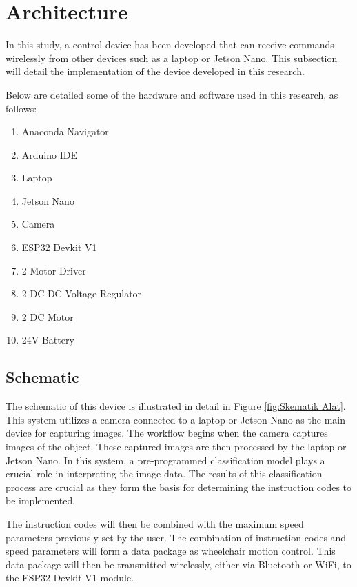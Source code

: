 \section{Architecture}
\label{sec:arsitektur}

In this study, a control device has been developed that can receive commands wirelessly from other devices such as a laptop or Jetson Nano. This subsection will detail the implementation of the device developed in this research.

Below are detailed some of the hardware and software used in this research, as follows:
\begin{enumerate}
    \item Anaconda Navigator
    \item Arduino IDE 
    \item Laptop 
    \item Jetson Nano
    \item Camera
    \item ESP32 Devkit V1
    \item 2 Motor Driver
    \item 2 DC-DC Voltage Regulator
    \item 2 DC Motor
    \item 24V Battery
\end{enumerate}

\subsection{Schematic}
\label{subsec:skematik alat}

The schematic of this device is illustrated in detail in Figure \ref{fig:Skematik Alat}. This system utilizes a camera connected to a laptop or Jetson Nano as the main device for capturing images. The workflow begins when the camera captures images of the object. These captured images are then processed by the laptop or Jetson Nano. In this system, a pre-programmed classification model plays a crucial role in interpreting the image data. The results of this classification process are crucial as they form the basis for determining the instruction codes to be implemented.

The instruction codes will then be combined with the maximum speed parameters previously set by the user. The combination of instruction codes and speed parameters will form a data package as wheelchair motion control. This data package will then be transmitted wirelessly, either via Bluetooth or WiFi, to the ESP32 Devkit V1 module.

